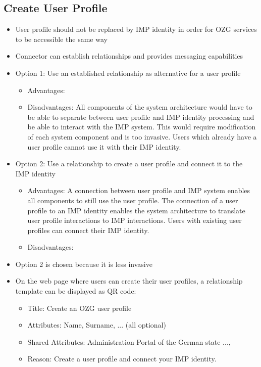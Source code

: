 \subsection{Create User Profile}
\begin{itemize}
    \item User profile should not be replaced by IMP identity in order for OZG services to be accessible the same way
    \item Connector can establish relationships and provides messaging capabilities
    \item Option 1: Use an established relationship as alternative for a user profile
    \begin{itemize}
        \item Advantages: 
        \item Disadvantages: All components of the system architecture would have to be able to separate between user profile and IMP identity processing and be able to interact with the IMP system. This would require modification of each system component and is too invasive. Users which already have a user profile cannot use it with their IMP identity.
    \end{itemize}
    \item Option 2: Use a relationship to create a user profile and connect it to the IMP identity
    \begin{itemize}
        \item Advantages: A connection between user profile and IMP system enables all components to still use the user profile. The connection of a user profile to an IMP identity enables the system architecture to translate user profile interactions to IMP interactions. Users with existing user profiles can connect their IMP identity.
        \item Disadvantages: 
    \end{itemize}
    \item Option 2 is chosen because it is less invasive
    \item On the web page where users can create their user profiles, a relationship template can be displayed as QR code:
    \begin{itemize}
        \item Title: Create an OZG user profile
        \item Attributes: Name, Surname, ... (all optional)
        \item Shared Attributes: Administration Portal of the German state ...,
        \item Reason: Create a user profile and connect your IMP identity.

\end{itemize}
\end{itemize}
